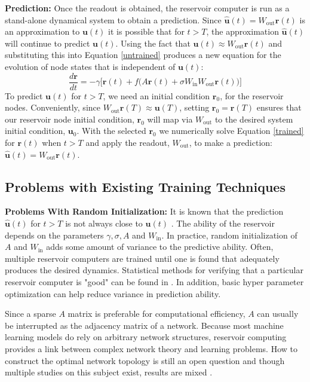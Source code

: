 \documentclass[journal]{journal}
\begin{document}
\textbf{Prediction: }
Once the readout is obtained, the reservoir computer is run as a stand-alone dynamical system to obtain a prediction. Since $\hat{\mathbf{u}}(t) = W_\text{out}\mathbf{r}(t)$ is an approximation to $\mathbf{u}(t)$ 
it is possible that for $t > T$, the approximation $\hat{\mathbf{u}}(t)$ will continue to predict $\mathbf{u}(t)$. Using the fact that $\mathbf{u}(t) \approx W_\text{out} \mathbf{r}(t)$ and substituting this into Equation \ref{untrained} produces a new equation for the evolution of node states that is independent of $\mathbf{u}(t)$:
\begin{equation}\label{trained}
\frac{d\mathbf{r}}{dt} = -\gamma\big[\mathbf{r}(t) + f\big(A\mathbf{r}(t) + \sigma W_\text{in} W_\text{out}\mathbf{r}(t)\big)\big]
\end{equation}
To predict $\mathbf{u}(t)$ for $t > T$, we need an initial condition $\mathbf{r}_0$, for the reservoir nodes. Conveniently, since $W_\text{out} \mathbf{r}(T) \approx \mathbf{u}(T)$, setting $\mathbf{r}_0 = \mathbf{r}(T)$ ensures that our reservoir node initial condition, $\mathbf{r}_0$ will map via $W_\text{out}$ to the desired system initial condition, $\mathbf{u}_0$. With  the selected $\mathbf{r}_0$ we numerically solve Equation \ref{trained} for $\mathbf{r}(t)$ when $t > T$ and apply the readout, $W_\text{out}$, to make a prediction: $\hat{\mathbf{u}}(t) = W_\text{out} \mathbf{r}(t)$.

\subsection{Problems with Existing Training Techniques}
\textbf{Problems With Random Initialization:} It is known that the prediction $\hat{\mathbf{u}}(t)$ for  $ t > T$ is not always close to $\mathbf{u}(t)$ \cite{Haluszczynski2019}. The ability of the reservoir depends on the parameters $\gamma, \sigma, A$ and $W_\text{in}$. In practice, random initialization of $A$ and $W_\text{in}$ adds some amount of variance to the predictive ability. Often, multiple reservoir computers are trained until one is found that adequately produces the desired dynamics. Statistical methods for verifying that a particular reservoir computer is "good" can be found in \cite{Haluszczynski2019}. In addition, basic hyper parameter optimization can help reduce variance in prediction ability.

Since a sparse $A$ matrix is preferable for computational efficiency, $A$ can usually be interrupted as the adjacency matrix of a network. Because most machine learning models do rely on arbitrary network structures, reservoir computing provides a link between complex network theory and learning problems. How to construct the optimal network topology is still an open question and though multiple studies on this subject exist, results are mixed \cite{Griffith2019, Pecora2019, Kawai2019}.
\end{document}
